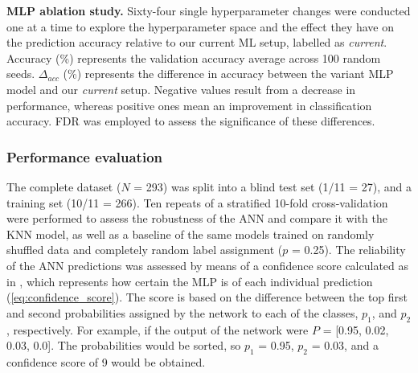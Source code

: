 \addtocounter{table}{-1}


\begin{center}
\captionsetup{type=table} %
\caption[MLP ablation study]{\textbf{MLP ablation study.} Sixty-four single hyperparameter changes were conducted one at a time to explore the hyperparameter space and the effect they have on the prediction accuracy relative to our current ML setup, labelled as \textit{current}. Accuracy (\%) represents the validation accuracy average across 100 random seeds. $\Delta_{acc}$ (\%) represents the difference in accuracy between the variant MLP model and our \textit{current} setup. Negative values result from a decrease in performance, whereas positive ones mean an improvement in classification accuracy. FDR was employed to assess the significance of these differences.}
\label{tab:MLP_ablation}
\end{center}

\vspace{-23pt} %
\vspace{-13pt} %

\subsubsection{Performance evaluation}

The complete dataset ($N$ = 293) was split into a blind test set (1/11 = 27), and a training set (10/11 = 266). Ten repeats of a stratified 10-fold cross-validation were performed to assess the robustness of the ANN and compare it with the KNN model, as well as a baseline of the same models trained on randomly shuffled data and completely random label assignment ($p$ = 0.25). The reliability of the ANN predictions was assessed by means of a confidence score calculated as in \cite{CUFF_2000_PROFILES}, which represents how certain the MLP is of each individual prediction (\autoref{eq:confidence_score}). The score is based on the difference between the top first and second probabilities assigned by the network to each of the classes, $p_{1}$, and $p_{2}$, respectively. For example, if the output of the network were $P$ = [0.95, 0.02, 0.03, 0.0]. The probabilities would be sorted, so $p_{1}$ = 0.95, $p_{2}$ = 0.03, and a confidence score of 9 would be obtained.

\vspace{-12pt} %

